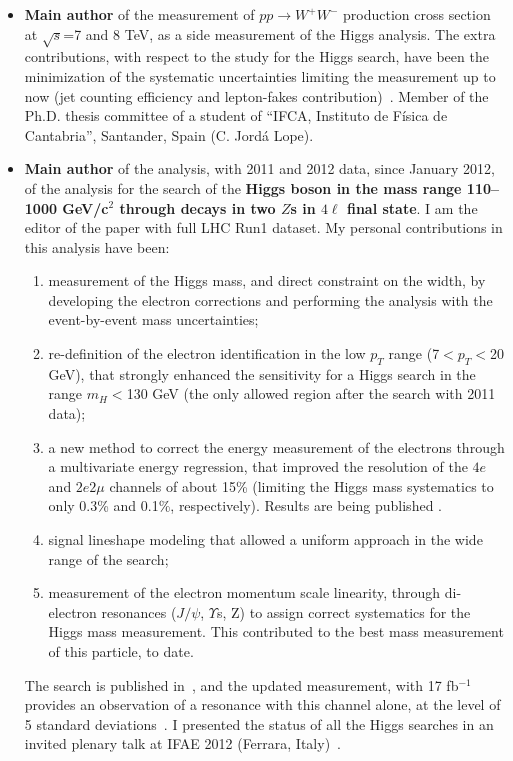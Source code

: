 \documentclass[11pt,twoside,a4paper]{article}
\begin{document}
\begin{enumerate}
\begin {itemize}
  \item {\bf Main author} of the measurement of $pp\to W^+W^-$
    production cross section at $\sqrt{s}$=7 and 8 TeV, as a side
    measurement of the Higgs analysis. The extra contributions, with
    respect to the study for the Higgs search, have been the
    minimization of the systematic uncertainties limiting the
    measurement up to now (jet counting efficiency and lepton-fakes
    contribution)~\cite{pas_WW1,pas_WW2}. Member of the Ph.D. thesis
    committee of a student of ``IFCA, Instituto de F\'isica de
    Cantabria'', Santander, Spain (C. Jord\'a Lope).
    
  \item {\bf Main author} of the analysis, with 2011 and 2012 data,
    since January 2012, of the analysis for the search of the {\bf
      Higgs boson in the mass range 110--1000 GeV/c$^2$ through decays
      in two $Z$s in $4\ell$ final state}. I am the editor of the
    paper with full LHC Run1 dataset.  My personal contributions in
    this analysis have been:
    \begin{enumerate}
    \item measurement of the Higgs mass, and direct constraint on the
      width, by developing the electron corrections and performing the
      analysis with the event-by-event mass uncertainties;
    \item re-definition of the electron identification in the low
      $p_T$ range (7$<p_T<$20 GeV), that strongly enhanced the
      sensitivity for a Higgs search in the range $m_H<$130 GeV (the
      only allowed region after the search with 2011 data);
    \item a new method to correct the energy measurement of the
      electrons through a multivariate energy regression, that
      improved the resolution of the $4e$ and $2e2\mu$ channels of
      about 15\% (limiting the Higgs mass systematics to only 0.3\%
      and 0.1\%, respectively). Results are being published
      \cite{pas_HZZProp}.
    \item signal lineshape modeling that allowed a uniform approach in
      the wide range of the search;
    \item measurement of the electron momentum scale linearity,
      through di-electron resonances ($J/\psi$, $\Upsilon$s, Z) to
      assign correct systematics for the Higgs mass measurement. This
      contributed to the best mass measurement of this particle, to
      date.
    \end{enumerate}
    The search is published in~\cite{higgsdiscovery}, and the updated
    measurement, with 17 fb$^{-1}$ provides an observation of a
    resonance with this channel alone, at the level of 5 standard
    deviations~\cite{pas_HZZ2}.  I presented the status of all the
    Higgs searches in an invited plenary talk at IFAE 2012 (Ferrara,
    Italy)~\cite{conf_ifae12,proc_ifae2012}.


\end{itemize}
\end{enumerate}
\end{document}
